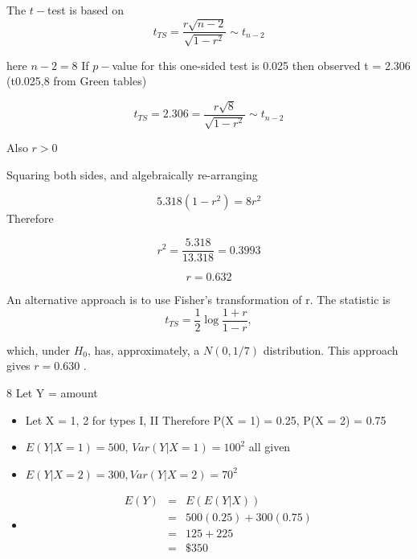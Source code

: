 \documentclass[a4paper,12pt]{article}
\begin{document}


The $t-$test is based on
\[ t_{TS} = \frac{r\sqrt{n-2}}{\sqrt{1-r^2}} \sim t_{n-2}\]

here $n − 2 = 8$
If $p-$value for this one-sided test is 0.025 then observed t = 2.306 (t0.025,8 from
Green tables)


\[ t_{TS} = 2.306 = \frac{r\sqrt{8}}{\sqrt{1-r^2}} \sim t_{n-2}\]

Also  $r > 0$

Squaring both sides, and algebraically re-arranging

\[5.318 (1 − r^2) = 8r^2\]
Therefore

\[r^2 = \frac{5.318}{13.318}=  0.3993\]

\[r = 0.632\]




An alternative approach is to use Fisher’s transformation of r. The
statistic is
\[ t_{TS} = \frac{1}{2} \log \frac{1+r}{1-r}, \]

which, under $H_0$, has, approximately, a $N(0,1/7)$ distribution.
This approach gives $r = 0.630$ .


8 Let Y = amount
\begin{itemize}
    \item Let X = 1, 2 for types I, II
Therefore P(X = 1) = 0.25, P(X = 2) = 0.75
\item $E(Y|X = 1) = 500$, $Var(Y|X = 1) = 100^2$
all given
\item $E(Y|X = 2) = 300, Var(Y|X = 2) = 70^2$
\item \begin{eqnarray*}
E(Y) &=& E(E(Y|X)) \\ &=& 500(0.25) + 300(0.75)\\
&=& 125 + 225 \\ &=& \$350\\
\end{eqnarray*}
\end{itemize}
\end{document}
